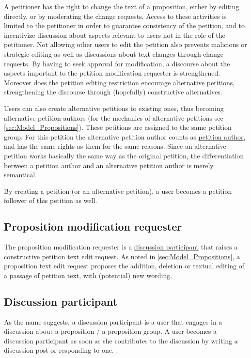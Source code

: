 A petitioner has the right to change the text of a proposition, either by editing directly, or by moderating the change requests. Access to these activities is limited to the petitioner in order to guarantee consistency of the petition, and to incentivize discussion about aspects relevant to users not in the role of the petitioner. Not allowing other users to edit the petition also prevents malicious or strategic editing as well as discussions about text changes through change requests. By having to seek approval for modification, a discourse about the aspects important to the petition modification requester is strengthened.
Moreover does the petition editing restriction encourage alternative petitions, strengthening the discourse through (hopefully) constructive alternatives.

Users can also create alternative petitions to existing ones, thus becoming alternative petition authors (for the mechanics of alternative petitions see \ref{sec:Model_Propositions}). These petitions are assigned to the same petition group. For this petition the alternative petition author counts as \href{sssec:Roles_Petitioner}{petition author}, and has the same rights as them for the same reasons. Since an alternative petition works basically the same way as the original petition, the differentiation between a petition author and an alternative petition author is merely semantical. 

By creating a petition (or an alternative petition), a user becomes a petition follower of this petition as well.

\subsection{Proposition modification requester}
The proposition modification requester is a \href{sssec:Roles_DiscussionParticipant}{discussion participant} that raises a constructive petition text edit request. 
As noted in \ref{sec:Model_Propositions}, a proposition text edit request proposes the addition, deletion or textual editing of a passage of petition text, with (potential) new wording. 

\subsection{Discussion participant}
\label{ssec:Roles_DiscussionParticipant}
As the name suggests, a discussion participant is a user that engages in a discussion about a proposition / a proposition group. A user becomes a discussion participant as soon as she contributes to the discussion by writing a discussion post or responding to one. .

